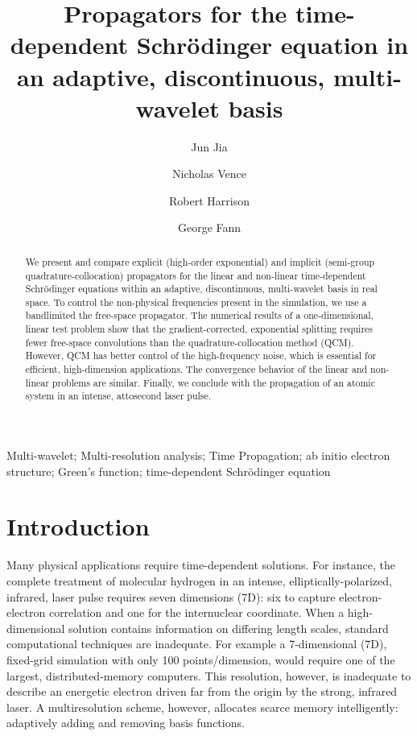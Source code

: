 \documentclass[review,letterpaper]{elsarticle}
\newcommand{\comment}[1]{} %
\begin{document}
\begin{frontmatter}

\title{Propagators for the time-dependent Schr\"odinger equation in an adaptive, discontinuous, multi-wavelet basis}

\author[add]{Jun Jia}         
\author[add]{Nicholas Vence}  
\author[add]{Robert Harrison} 
\author[add]{George Fann}     

\begin{abstract}

We present and compare explicit (high-order exponential) and implicit
(semi-group quadrature-collocation) propagators for the linear and non-linear time-dependent
Schr\"odinger equations within an adaptive, discontinuous, multi-wavelet basis in real space.
To control the non-physical frequencies present in the simulation, we use a bandlimited the free-space propagator.
The numerical results of a one-dimensional, linear test problem show that the gradient-corrected, exponential splitting requires fewer free-space convolutions than the quadrature-collocation method (QCM).
However, QCM has better control of the high-frequency noise, which is essential for efficient, high-dimension applications. The convergence behavior of the linear and non-linear problems are similar. Finally, we conclude with the propagation of an atomic system in an intense, attosecond laser pulse.
\end{abstract}

\begin{keyword}
Multi-wavelet; Multi-resolution analysis; Time Propagation; ab initio electron structure;
Green's function; time-dependent Schr\"odinger equation
\comment{
{\em Subject classifications:}
  65B05, %
  65F10, %
  65M99. %
}
\end{keyword}

\end{frontmatter}



\section{Introduction}
Many physical applications require time-dependent solutions.
For instance, the complete treatment of molecular hydrogen in an intense, elliptically-polarized, infrared, laser pulse requires seven dimensions (7D): six to capture electron-electron correlation and one for the internuclear coordinate.
When a high-dimensional solution contains information on differing length scales, standard computational techniques are inadequate.
For example a 7-dimensional (7D), fixed-grid simulation with only 100 points/dimension, would require one of the largest, distributed-memory computers.
This resolution, however, is inadequate to describe an energetic electron driven far from the origin by the strong, infrared laser.
A multiresolution scheme, however, allocates scarce memory intelligently:
adaptively adding and removing basis functions.
\end{document}
